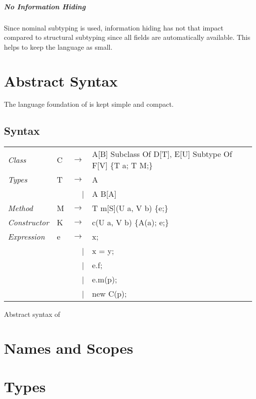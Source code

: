 \paragraph{No Information Hiding}
Since nominal subtyping is used, information hiding has not that impact
compared to structural subtyping since all fields are automatically
available. This helps to keep the language as small.

\chapter{Abstract Syntax}
The language foundation of \ooplss is kept simple and compact. 

\section{Syntax}
\begin{listing}
	\begin{tabular}[H]{llrll}
		\emph{Class}					& C	& $\longrightarrow$ 		& A[B] Subclass Of D[T], E[U] Subtype Of F[V] \{T a; T M;\} \\
		\emph{Types}					& T & $\longrightarrow$ 		& A \\
													&   & 									 | & A \match B[A] \\
		\emph{Method}					& M	& $\longrightarrow$ 		& T m[S](U a, V b) \{e;\} \\
		\emph{Constructor}		& K	& $\longrightarrow$ 		& c(U a, V b) \{A(a); e;\} \\
		\emph{Expression}			& e & $\longrightarrow$ 		& x; \\
													&   & 									 | & x = y; \\
													&   & 									 | & e.f; \\
													&   & 									 | & e.m(p); \\
													&   & 									 | & new C(p); \\
	\end{tabular}
\caption{Abstract syntax of \ooplss}
\label{lst:abstractSyntax}
\end{listing}


\chapter{Names and Scopes}

\chapter{Types}
